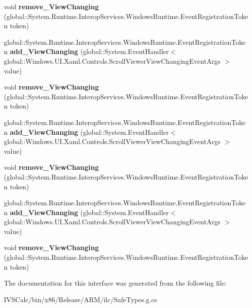 \begin{DoxyCompactItemize}
void {\bfseries remove\+\_\+\+View\+Changing} (global\+::\+System.\+Runtime.\+Interop\+Services.\+Windows\+Runtime.\+Event\+Registration\+Token token)
\item 
\mbox{\label{interface_windows_1_1_u_i_1_1_xaml_1_1_controls_1_1_i_scroll_viewer2_ab9faa4a9ca64c26b97189526048850c2}} 
global\+::\+System.\+Runtime.\+Interop\+Services.\+Windows\+Runtime.\+Event\+Registration\+Token {\bfseries add\+\_\+\+View\+Changing} (global\+::\+System.\+Event\+Handler$<$ global\+::\+Windows.\+U\+I.\+Xaml.\+Controls.\+Scroll\+Viewer\+View\+Changing\+Event\+Args $>$ value)
\item 
\mbox{\label{interface_windows_1_1_u_i_1_1_xaml_1_1_controls_1_1_i_scroll_viewer2_a2b45356f899d6a5457fe98be7fc73d44}} 
void {\bfseries remove\+\_\+\+View\+Changing} (global\+::\+System.\+Runtime.\+Interop\+Services.\+Windows\+Runtime.\+Event\+Registration\+Token token)
\item 
\mbox{\label{interface_windows_1_1_u_i_1_1_xaml_1_1_controls_1_1_i_scroll_viewer2_ab9faa4a9ca64c26b97189526048850c2}} 
global\+::\+System.\+Runtime.\+Interop\+Services.\+Windows\+Runtime.\+Event\+Registration\+Token {\bfseries add\+\_\+\+View\+Changing} (global\+::\+System.\+Event\+Handler$<$ global\+::\+Windows.\+U\+I.\+Xaml.\+Controls.\+Scroll\+Viewer\+View\+Changing\+Event\+Args $>$ value)
\item 
\mbox{\label{interface_windows_1_1_u_i_1_1_xaml_1_1_controls_1_1_i_scroll_viewer2_a2b45356f899d6a5457fe98be7fc73d44}} 
void {\bfseries remove\+\_\+\+View\+Changing} (global\+::\+System.\+Runtime.\+Interop\+Services.\+Windows\+Runtime.\+Event\+Registration\+Token token)
\item 
\mbox{\label{interface_windows_1_1_u_i_1_1_xaml_1_1_controls_1_1_i_scroll_viewer2_ab9faa4a9ca64c26b97189526048850c2}} 
global\+::\+System.\+Runtime.\+Interop\+Services.\+Windows\+Runtime.\+Event\+Registration\+Token {\bfseries add\+\_\+\+View\+Changing} (global\+::\+System.\+Event\+Handler$<$ global\+::\+Windows.\+U\+I.\+Xaml.\+Controls.\+Scroll\+Viewer\+View\+Changing\+Event\+Args $>$ value)
\item 
\mbox{\label{interface_windows_1_1_u_i_1_1_xaml_1_1_controls_1_1_i_scroll_viewer2_a2b45356f899d6a5457fe98be7fc73d44}} 
void {\bfseries remove\+\_\+\+View\+Changing} (global\+::\+System.\+Runtime.\+Interop\+Services.\+Windows\+Runtime.\+Event\+Registration\+Token token)
\end{DoxyCompactItemize}


The documentation for this interface was generated from the following file\+:\begin{DoxyCompactItemize}
\item 
I\+V\+S\+Calc/bin/x86/\+Release/\+A\+R\+M/ilc/Safe\+Types.\+g.\+cs\end{DoxyCompactItemize}
